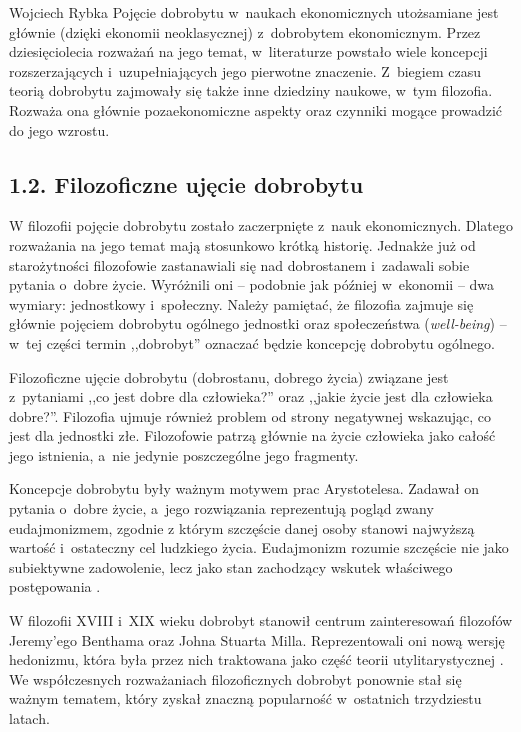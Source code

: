 \begin{artplenv}{Wojciech Rybka}
Pojęcie dobrobytu w~naukach ekonomicznych utożsamiane jest głównie (dzięki ekonomii neoklasycznej) z~dobrobytem
ekonomicznym. Przez dziesięciolecia rozważań na jego temat, w~literaturze powstało wiele koncepcji
rozszerzających i~uzupełniających jego pierwotne znaczenie. Z~biegiem czasu teorią dobrobytu
zajmowały się także inne dziedziny naukowe, w~tym filozofia. Rozważa ona głównie pozaekonomiczne
aspekty oraz czynniki mogące prowadzić do jego wzrostu. 

\subsection{1.2. Filozoficzne ujęcie dobrobytu}
W filozofii pojęcie dobrobytu zostało zaczerpnięte z~nauk ekonomicznych. Dlatego rozważania na jego temat mają
stosunkowo krótką historię. Jednakże już od starożytności filozofowie zastanawiali się nad dobrostanem i~zadawali sobie
pytania o~dobre życie. Wyróżnili oni -- podobnie jak później w~ekonomii -- dwa wymiary: jednostkowy i~społeczny. Należy
pamiętać, że filozofia zajmuje się głównie pojęciem dobrobytu ogólnego jednostki oraz społeczeństwa
(\textit{well-being}) -- w~tej części termin ,,dobrobyt'' oznaczać będzie koncepcję dobrobytu ogólnego. 

Filozoficzne ujęcie dobrobytu (dobrostanu, dobrego życia) związane jest z~pytaniami ,,co jest dobre dla człowieka?'' oraz
,,jakie życie jest dla człowieka dobre?''. Filozofia ujmuje również problem od strony negatywnej wskazując, co jest dla
jednostki złe. Filozofowie patrzą głównie na życie człowieka jako całość jego istnienia, a~nie jedynie poszczególne
jego fragmenty. 

Koncepcje dobrobytu były ważnym motywem prac Arystotelesa. Zadawał on pytania o~dobre życie,
a~jego rozwiązania reprezentują pogląd zwany eudajmonizmem,
zgodnie z którym szczęście danej osoby stanowi najwyższą wartość i~ostateczny cel ludzkiego
życia. Eudajmonizm rozumie szczęście nie jako subiektywne zadowolenie, lecz jako stan zachodzący wskutek właściwego
postępowania
\parencite{moleda_kantowska_2009}.

W filozofii XVIII i~XIX wieku dobrobyt stanowił centrum zainteresowań filozofów Jeremy'ego Benthama oraz Johna Stuarta
Milla. Reprezentowali oni nową wersję hedonizmu, która była przez nich traktowana jako część teorii utylitarystycznej
\parencite{brey_well-being_2012}.
We współczesnych rozważaniach filozoficznych dobrobyt ponownie stał się ważnym
tematem, który zyskał znaczną popularność w~ostatnich trzydziestu latach.


\end{artplenv}
